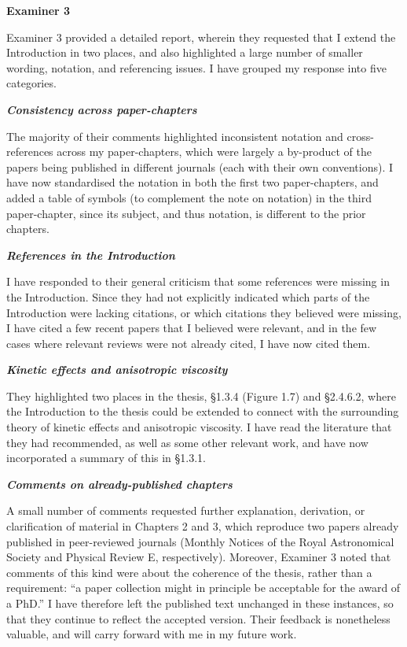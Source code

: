 \documentclass[11pt,a4paper]{article}
\begin{document}
\begin{center}
    {\large\bfseries Examiner 3}
\end{center}

Examiner 3 provided a detailed report, wherein they requested that I extend the Introduction in two places, and also highlighted a large number of smaller wording, notation, and referencing issues. I have grouped my response into five categories.

\textit{\textbf{Consistency across paper-chapters}}

The majority of their comments highlighted inconsistent notation and cross-references across my paper-chapters, which were largely a by-product of the papers being published in different journals (each with their own conventions). I have now standardised the notation in both the first two paper-chapters, and added a table of symbols (to complement the note on notation) in the third paper-chapter, since its subject, and thus notation, is different to the prior chapters.

\textit{\textbf{References in the Introduction}}

I have responded to their general criticism that some references were missing in the Introduction. Since they had not explicitly indicated which parts of the Introduction were lacking citations, or which citations they believed were missing, I have cited a few recent papers that I believed were relevant, and in the few cases where relevant reviews were not already cited, I have now cited them.

\textit{\textbf{Kinetic effects and anisotropic viscosity}}

They highlighted two places in the thesis, \S1.3.4 (Figure 1.7) and \S2.4.6.2, where the Introduction to the thesis could be extended to connect with the surrounding theory of kinetic effects and anisotropic viscosity. I have read the literature that they had recommended, as well as some other relevant work, and have now incorporated a summary of this in \S1.3.1.

\textit{\textbf{Comments on already-published chapters}}

A small number of comments requested further explanation, derivation, or clarification of material in Chapters 2 and 3, which reproduce two papers already published in peer-reviewed journals (Monthly Notices of the Royal Astronomical Society and Physical Review E, respectively). Moreover, Examiner 3 noted that comments of this kind were about the coherence of the thesis, rather than a requirement: ``a paper collection might in principle be acceptable for the award of a PhD.'' I have therefore left the published text unchanged in these instances, so that they continue to reflect the accepted version. Their feedback is nonetheless valuable, and will carry forward with me in my future work.
\end{document}
